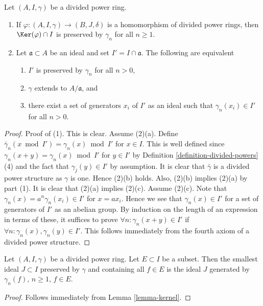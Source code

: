 \begin{lemma}
\label{lemma-kernel}
Let $(A, I, \gamma)$ be a divided power ring.
\begin{enumerate}
\item If $\varphi : (A, I, \gamma) \to (B, J, \delta)$ is a
homomorphism of divided power rings, then $\Ker(\varphi) \cap I$
is preserved by $\gamma_n$ for all $n \geq 1$.
\item Let $\mathfrak a \subset A$ be an ideal and set
$I' = I \cap \mathfrak a$. The following are equivalent
\begin{enumerate}
\item $I'$ is preserved by $\gamma_n$ for all $n > 0$,
\item $\gamma$ extends to $A/\mathfrak a$, and
\item there exist a set of generators $x_i$ of $I'$ as an ideal
such that $\gamma_n(x_i) \in I'$ for all $n > 0$.
\end{enumerate}
\end{enumerate}
\end{lemma}

\begin{proof}
Proof of (1). This is clear. Assume (2)(a). Define
$\bar\gamma_n(x \bmod I') = \gamma_n(x) \bmod I'$ for $x \in I$.
This is well defined since $\gamma_n(x + y) = \gamma_n(x) \bmod I'$
for $y \in I'$ by Definition \ref{definition-divided-powers} (4) and
the fact that $\gamma_j(y) \in I'$ by assumption. It is clear that
$\bar\gamma$ is a divided power structure as $\gamma$ is one.
Hence (2)(b) holds. Also, (2)(b) implies (2)(a) by part (1).
It is clear that (2)(a) implies (2)(c). Assume (2)(c).
Note that $\gamma_n(x) = a^n\gamma_n(x_i) \in I'$ for $x = ax_i$.
Hence we see that $\gamma_n(x) \in I'$ for a set of generators of $I'$
as an abelian group. By induction on the length of an expression in
terms of these, it suffices to prove $\forall n : \gamma_n(x + y) \in I'$
if $\forall n : \gamma_n(x), \gamma_n(y) \in I'$. This
follows immediately from the fourth axiom of a divided power structure.
\end{proof}

\begin{lemma}
\label{lemma-sub-dp-ideal}
Let $(A, I, \gamma)$ be a divided power ring.
Let $E \subset I$ be a subset.
Then the smallest ideal $J \subset I$ preserved by $\gamma$
and containing all $f \in E$ is the ideal $J$ generated by
$\gamma_n(f)$, $n \geq 1$, $f \in E$.
\end{lemma}

\begin{proof}
Follows immediately from Lemma \ref{lemma-kernel}.
\end{proof}

